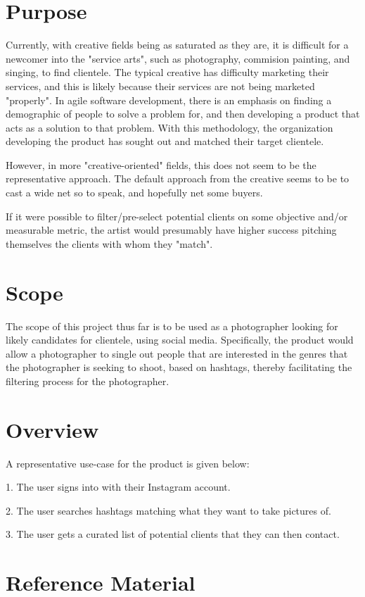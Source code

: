 \section{Purpose}
Currently, with creative fields being as saturated as they are, 
it is difficult for a newcomer into the "service arts", such as photography, commision painting, and singing,
to find clientele. The typical creative has difficulty marketing their services, and this is likely because 
their services are not being marketed "properly". In agile software development, there is an emphasis on 
finding a demographic of people to solve a problem for, and then developing a product that acts as a solution
to that problem. With this methodology, the organization developing the product has sought out and matched their target clientele.

However, in more "creative-oriented" fields, this does not seem to be the representative approach. The default approach from the 
creative seems to be to cast a wide net so to speak, and hopefully net some buyers.

If it were possible to filter/pre-select potential clients on some objective and/or measurable metric, the artist 
would presumably have higher success pitching themselves the clients with whom they "match".

\section{Scope}
The scope of this project thus far is to be used as a photographer looking for likely candidates for clientele,
using social media. Specifically, the product would allow a photographer to single out people that are interested in the genres that the 
photographer is seeking to shoot, based on hashtags, thereby facilitating the filtering process for the photographer.

\section{Overview}
A representative use-case for the product is given below:

1. The user signs into \serviceName with their Instagram account.

2. The user searches hashtags matching what they want to take pictures of.

3. The user gets a curated list of potential clients that they can then contact.

\section{Reference Material}
